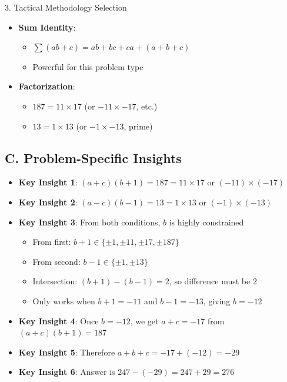 \documentclass[12pt]{article}
\begin{document}
\begin{tacticsbox}{3. Tactical Methodology Selection}
\begin{itemize}[leftmargin=*]
    \item \textbf{Sum Identity}:
    \begin{itemize}
        \item $\sum (ab + c) = ab + bc + ca + (a+b+c)$
        \item Powerful for this problem type
    \end{itemize}
    
    \item \textbf{Factorization}: 
    \begin{itemize}
        \item $187 = 11 \times 17$ (or $-11 \times -17$, etc.)
        \item $13 = 1 \times 13$ (or $-1 \times -13$, prime)
    \end{itemize}
\end{itemize}

\subsection*{C. Problem-Specific Insights}
\begin{itemize}[leftmargin=*]
    \item \textbf{Key Insight 1}: $(a+c)(b+1) = 187 = 11 \times 17$ or $(-11) \times (-17)$
    
    \item \textbf{Key Insight 2}: $(a-c)(b-1) = 13 = 1 \times 13$ or $(-1) \times (-13)$
    
    \item \textbf{Key Insight 3}: From both conditions, $b$ is highly constrained
    \begin{itemize}
        \item From first: $b+1 \in \{\pm 1, \pm 11, \pm 17, \pm 187\}$
        \item From second: $b-1 \in \{\pm 1, \pm 13\}$
        \item Intersection: $(b+1) - (b-1) = 2$, so difference must be 2
        \item Only works when $b+1 = -11$ and $b-1 = -13$, giving $b = -12$
    \end{itemize}
    
    \item \textbf{Key Insight 4}: Once $b = -12$, we get $a+c = -17$ from $(a+c)(b+1) = 187$
    
    \item \textbf{Key Insight 5}: Therefore $a+b+c = -17 + (-12) = -29$
    
    \item \textbf{Key Insight 6}: Answer is $247 - (-29) = 247 + 29 = 276$
\end{itemize}

\end{tacticsbox}
\end{document}
